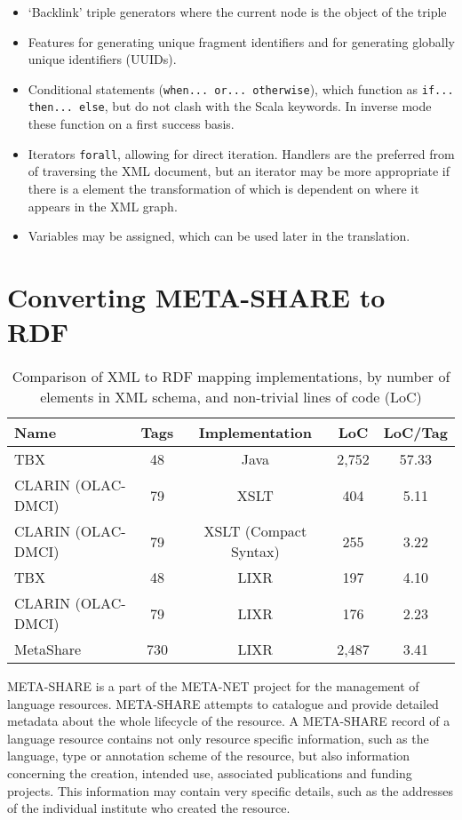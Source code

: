 \documentclass{acm_proc_article-sp}
\begin{document}
\begin{itemize}
\item `Backlink' triple generators where the current node is the object of the triple
\item Features for generating unique fragment identifiers and for generating globally unique 
identifiers (UUIDs).
\item Conditional statements ({\tt when... or... otherwise}), which function as
{\tt if... then... else}, but do not clash with the Scala keywords. In inverse mode
these function on a first success basis.
\item Iterators {\tt forall}, allowing for direct iteration. Handlers are the 
preferred from of traversing the XML document, but an iterator may be more appropriate 
if there is a element the transformation of which is dependent on where it appears in the
XML graph.
\item Variables may be assigned, which can be used later in the translation.
\end{itemize}

\section{Converting META-SHARE to RDF}
\label{sec:metashare}
\begin{table*}
\begin{center}
\begin{tabular}{p{4cm}|cccc}
Name & Tags & Implementation & LoC & LoC/Tag \\
\hline
TBX & 48 & Java & 2,752 & 57.33 \\
CLARIN (OLAC-DMCI) & 79 & XSLT & 404 & 5.11 \\
CLARIN (OLAC-DMCI) & 79 & XSLT (Compact Syntax) & 255 & 3.22 \\
\hline
TBX & 48 & LIXR & 197 & 4.10 \\
CLARIN (OLAC-DMCI) & 79 & LIXR & 176 & 2.23 \\
MetaShare & 730 & LIXR & 2,487 & 3.41 \\
\end{tabular}
\end{center}
\caption{\label{tab:locs}Comparison of XML to RDF mapping implementations,
by number of elements in XML schema, and non-trivial lines of code (LoC)}
\end{table*}

META-SHARE is a part of the META-NET project for the management of language resources. 
META-SHARE attempts to catalogue and provide detailed metadata about the whole
lifecycle of the resource. A META-SHARE record of a language resource
contains not only resource specific information, such as the language, type
or annotation scheme of the resource, but also information concerning the
creation, intended use, associated publications and funding projects. This 
information may contain very specific details, such as the addresses of the individual
institute who created the resource.
\end{document}
